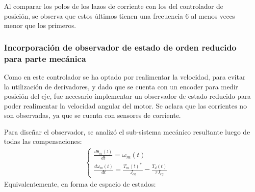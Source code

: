 \documentclass[a4paper, 10pt, onecolumn,journal]{ieeeconf}
\begin{document}
Al comparar los polos de los lazos de corriente con los del controlador de posición, se observa que estos últimos tienen una frecuencia 6 al menos veces menor que los primeros.


\subsubsection{\textbf{Incorporación de observador de estado de orden reducido para parte mecánica}}
Como en este controlador se ha optado por realimentar la velocidad, para evitar la utilización de derivadores, y dado que se cuenta con un encoder para medir posición del eje, fue necesario implementar un observador de estado reducido para poder realimentar la velocidad angular del motor. Se aclara que las corrientes no son observadas, ya que se cuenta con sensores de corriente.

Para diseñar el observador, se analizó el sub-sistema mecánico resultante luego de todas las compensaciones:
\begin{align}
	\begin{cases}
		\frac{d\theta_m(t)}{dt} ={\omega}_m(t)\\
		\frac{d\omega_m(t)}{dt} = \frac{{T_m(t)}^{*'}}{ J_{eq}}- \frac{T_d(t)}{r J_{eq}}
	\end{cases}\label{ecuacion de subsistema mecanico compensado}
\end{align}
 Equivalentemente, en forma de espacio de estados:
 
\end{document}
